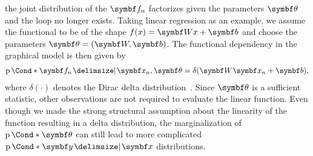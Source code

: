 the joint distribution of the $\mat{f}_n$ factorizes given the parameters $\mat{\theta}$ and the loop no longer exists.
Taking linear regression as an example, we assume the functional to be of the shape $f(x) = \mat{W}x + \mat{b}$ and choose the parameters $\mat{\theta} = (\mat{W}, \mat{b})$.
The functional dependency in the graphical model is then given by
\begin{equation}
    \begin{split}
        \Prob*{\mat{f}_n \given \mat{x}_n, \mat{\theta}} = \delta(\mat{W}\mat{x}_n + \mat{b}),
    \end{split}
\end{equation}
where $\delta(\cdot)$ denotes the Dirac delta distribution~\parencite{murphy_machine_2012}.
Since $\mat{\theta}$ is a sufficient statistic, other observations are not required to evaluate the linear function.
Even though we made the strong structural assumption about the linearity of the function resulting in a delta distribution, the marginalization of $\Prob*{\mat{\theta}}$ can still lead to more complicated $\Prob*{\mat{y} \given \mat{x}}$ distributions.

